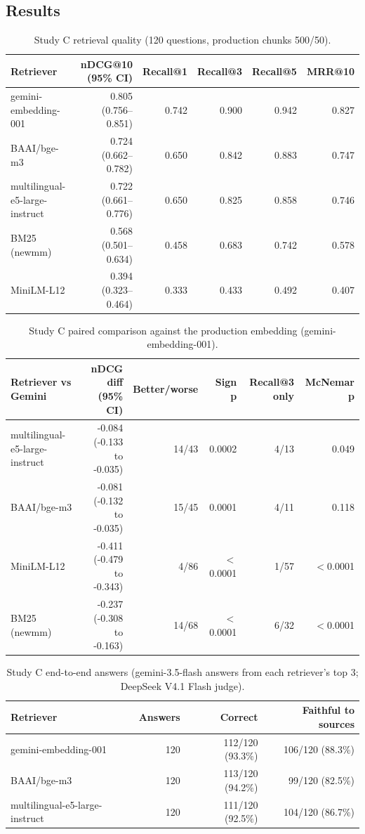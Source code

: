 \documentclass[11pt,a4paper]{article}
\begin{document}
\subsection{Results}
\begin{table}[H]
\centering
\small
\caption{Study C retrieval quality (120 questions, production chunks 500/50).}\label{tab:c-retrieval}
\begin{tabular}{lrrrrr}
\toprule
\textbf{Retriever} & \textbf{nDCG@10 (95\% CI)} & \textbf{Recall@1} & \textbf{Recall@3} & \textbf{Recall@5} & \textbf{MRR@10} \\
\midrule
gemini-embedding-001 & 0.805 (0.756--0.851) & 0.742 & 0.900 & 0.942 & 0.827 \\
BAAI/bge-m3 & 0.724 (0.662--0.782) & 0.650 & 0.842 & 0.883 & 0.747 \\
multilingual-e5-large-instruct & 0.722 (0.661--0.776) & 0.650 & 0.825 & 0.858 & 0.746 \\
BM25 (newmm) & 0.568 (0.501--0.634) & 0.458 & 0.683 & 0.742 & 0.578 \\
MiniLM-L12 & 0.394 (0.323--0.464) & 0.333 & 0.433 & 0.492 & 0.407 \\
\bottomrule
\end{tabular}
\end{table}
\begin{table}[H]
\centering
\footnotesize
\caption{Study C paired comparison against the production embedding (gemini-embedding-001).}\label{tab:c-paired}
\begin{tabular}{lrrrrr}
\toprule
\textbf{Retriever vs Gemini} & \textbf{nDCG diff (95\% CI)} & \textbf{Better/worse} & \textbf{Sign p} & \textbf{Recall@3 only} & \textbf{McNemar p} \\
\midrule
multilingual-e5-large-instruct & -0.084 (-0.133 to -0.035) & 14/43 & 0.0002 & 4/13 & 0.049 \\
BAAI/bge-m3 & -0.081 (-0.132 to -0.035) & 15/45 & 0.0001 & 4/11 & 0.118 \\
MiniLM-L12 & -0.411 (-0.479 to -0.343) & 4/86 & $<$0.0001 & 1/57 & $<$0.0001 \\
BM25 (newmm) & -0.237 (-0.308 to -0.163) & 14/68 & $<$0.0001 & 6/32 & $<$0.0001 \\
\bottomrule
\end{tabular}
\end{table}
\begin{table}[H]
\centering
\small
\caption{Study C end-to-end answers (gemini-3.5-flash answers from each retriever's top 3; DeepSeek V4.1 Flash judge).}\label{tab:c-e2e}
\begin{tabular}{lrrr}
\toprule
\textbf{Retriever} & \textbf{Answers} & \textbf{Correct} & \textbf{Faithful to sources} \\
\midrule
gemini-embedding-001 & 120 & 112/120 (93.3\%) & 106/120 (88.3\%) \\
BAAI/bge-m3 & 120 & 113/120 (94.2\%) & 99/120 (82.5\%) \\
multilingual-e5-large-instruct & 120 & 111/120 (92.5\%) & 104/120 (86.7\%) \\
\bottomrule
\end{tabular}
\end{table}
\end{document}
